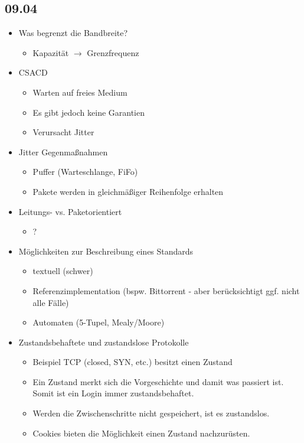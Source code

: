 \documentclass{article} %
\begin{document}
\subsection{09.04}
	\begin{itemize}
		\item Was begrenzt die Bandbreite?
			\begin{itemize}
				\item Kapazität $\rightarrow$ Grenzfrequenz
			\end{itemize}			
		\item CSACD
			\begin{itemize}
				\item Warten auf freies Medium
				\item Es gibt jedoch keine Garantien
				\item Verursacht Jitter
			\end{itemize}
		\item Jitter Gegenmaßnahmen
			\begin{itemize}
				\item Puffer (Warteschlange, FiFo)
				\item Pakete werden in gleichmäßiger Reihenfolge erhalten
			\end{itemize}
		\item Leitungs- vs. Paketorientiert
			\begin{itemize}
				\item ?
			\end{itemize}
		\item Möglichkeiten zur Beschreibung eines Standards
			\begin{itemize}
				\item textuell (schwer)
				\item Referenzimplementation (bspw. Bittorrent - aber berücksichtigt ggf. nicht alle Fälle)
				\item Automaten (5-Tupel, Mealy/Moore)
			\end{itemize}
		\item Zustandsbehaftete und zustandslose Protokolle
			\begin{itemize}
				\item Beispiel TCP (closed, SYN, etc.) besitzt einen Zustand
				\item Ein Zustand merkt sich die \glqq Vorgeschichte \grqq und damit was passiert ist. Somit ist ein Login immer zustandsbehaftet.
				\item Werden die Zwischenschritte nicht gespeichert, ist es zustandslos.
				\item Cookies bieten die Möglichkeit einen Zustand nachzurüsten.

\end{itemize}
\end{itemize}
\end{document}
